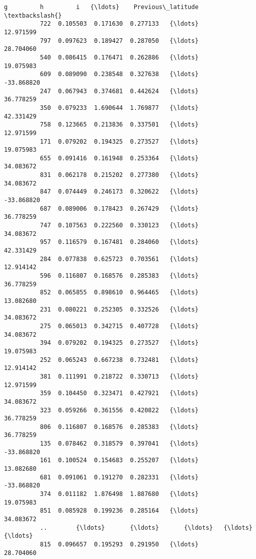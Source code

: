 \documentclass[11pt]{article}
\begin{document}
\begin{Verbatim}[commandchars=\\\{\}]
                      g         h         i   {\ldots}    Previous\_latitude  \textbackslash{}
          722  0.105503  0.171630  0.277133   {\ldots}            12.971599   
          797  0.097623  0.189427  0.287050   {\ldots}            28.704060   
          540  0.086415  0.176471  0.262886   {\ldots}            19.075983   
          609  0.089090  0.238548  0.327638   {\ldots}           -33.868820   
          247  0.067943  0.374681  0.442624   {\ldots}            36.778259   
          350  0.079233  1.690644  1.769877   {\ldots}            42.331429   
          758  0.123665  0.213836  0.337501   {\ldots}            12.971599   
          171  0.079202  0.194325  0.273527   {\ldots}            19.075983   
          655  0.091416  0.161948  0.253364   {\ldots}            34.083672   
          831  0.062178  0.215202  0.277380   {\ldots}            34.083672   
          847  0.074449  0.246173  0.320622   {\ldots}           -33.868820   
          687  0.089006  0.178423  0.267429   {\ldots}            36.778259   
          747  0.107563  0.222560  0.330123   {\ldots}            34.083672   
          957  0.116579  0.167481  0.284060   {\ldots}            42.331429   
          284  0.077838  0.625723  0.703561   {\ldots}            12.914142   
          596  0.116807  0.168576  0.285383   {\ldots}            36.778259   
          852  0.065855  0.898610  0.964465   {\ldots}            13.082680   
          231  0.080221  0.252305  0.332526   {\ldots}            34.083672   
          275  0.065013  0.342715  0.407728   {\ldots}            34.083672   
          394  0.079202  0.194325  0.273527   {\ldots}            19.075983   
          252  0.065243  0.667238  0.732481   {\ldots}            12.914142   
          381  0.111991  0.218722  0.330713   {\ldots}            12.971599   
          359  0.104450  0.323471  0.427921   {\ldots}            34.083672   
          323  0.059266  0.361556  0.420822   {\ldots}            36.778259   
          806  0.116807  0.168576  0.285383   {\ldots}            36.778259   
          135  0.078462  0.318579  0.397041   {\ldots}           -33.868820   
          161  0.100524  0.154683  0.255207   {\ldots}            13.082680   
          681  0.091061  0.191270  0.282331   {\ldots}           -33.868820   
          374  0.011182  1.876498  1.887680   {\ldots}            19.075983   
          851  0.085928  0.199236  0.285164   {\ldots}            34.083672   
          ..        {\ldots}       {\ldots}       {\ldots}   {\ldots}                  {\ldots}   
          815  0.096657  0.195293  0.291950   {\ldots}            28.704060   

\end{Verbatim}
\end{document}
